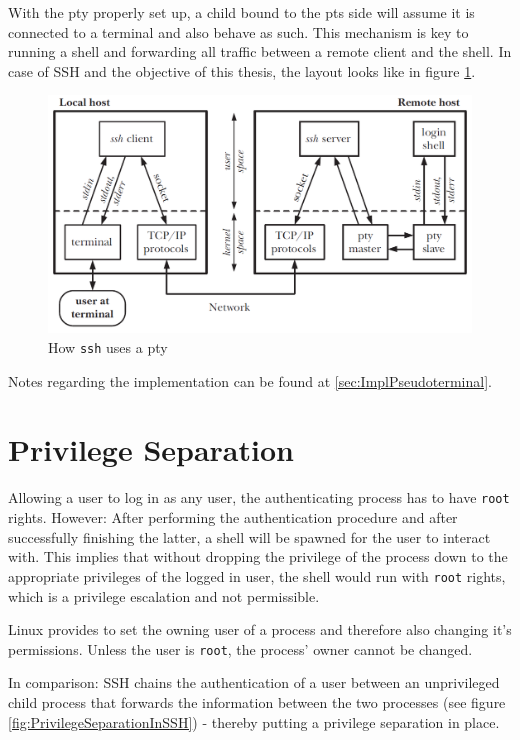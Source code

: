 \documentclass[10pt,a4paper,titlepage,twoside,english,final]{zhawreprt}
\begin{document}
With the \gls{pty} properly set up, a child bound to the \gls{pts} side will assume it is connected to a \gls{terminal} and also behave as such.
This mechanism is key to running a \gls{shell} and forwarding all traffic between a remote client and the \gls{shell}.
In case of \gls{SSH} and the objective of this thesis, the layout looks like in figure \ref{fig:HowSSHUsesPty}.
\begin{figure}[ht]
\includegraphics[width=\textwidth]{PseudoterminalSSH}
\caption{How \texttt{ssh} uses a \gls{pty} \citep[p.1378]{KerriskTLPI}}
\label{fig:HowSSHUsesPty}
\end{figure}

Notes regarding the implementation can be found at \ref{sec:ImplPseudoterminal}.


\newpage
\section{Privilege Separation}\label{sec:DesignPrivilegeSeparation}
Allowing a user to log in as any user, the authenticating process has to have \texttt{root} rights.
However: After performing the authentication procedure and after successfully finishing the latter, a \gls{shell} will be spawned for the user to interact with.
This implies that without dropping the privilege of the process down to the appropriate privileges of the logged in user, the \gls{shell} would run with \texttt{root} rights, which is a privilege escalation and not permissible.

\gls{Linux} provides \cite{setuid} to set the owning user of a process and therefore also changing it's permissions.
Unless the user is \texttt{root}, the process' owner cannot be changed.

In comparison: \gls{SSH} chains the authentication of a user between an unprivileged child process that forwards the information between the two processes (see figure \ref{fig:PrivilegeSeparationInSSH}) - thereby putting a privilege separation in place.
\end{document}
